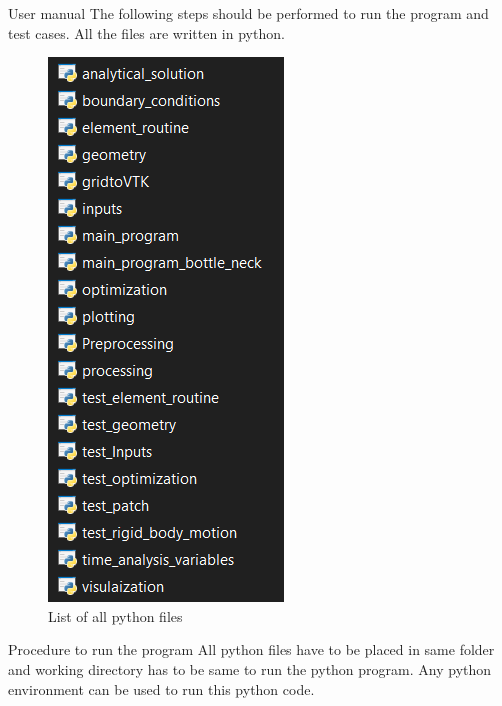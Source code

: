 \documentclass[a4paper,12pt,times]{article}
\begin{document}
\newpage
\begin{section}{User manual}
The following steps should be performed to run the program and test cases. All the files are written in python.
\begin{figure}[H]
	\begin{center}
		\includegraphics[scale=1]{list_of_files.png} 
		\caption{List of all python files}\label{list of files}
	\end{center}	
\end{figure}
\begin{subsection}{Procedure to run the program}
All python files have to be placed in same folder and working directory has to be same to run the python program. Any python environment can be used to run this python code.


\end{subsection}
\end{section}
\end{document}
